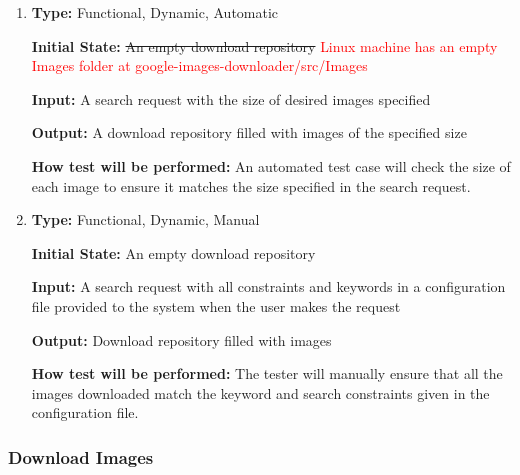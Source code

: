 \documentclass[12pt, titlepage]{article}
\begin{document}
\begin{enumerate}[label=FR-SQ\arabic*:, wide=0pt, leftmargin=*]
\item \phantom{empty}

\textbf{Type:} Functional, Dynamic, Automatic
					
\textbf{Initial State:} \sout{An empty download repository}
\textcolor{red}{Linux machine has an empty Images folder at google-images-downloader/src/Images}
					
\textbf{Input:} A search request with the size of desired images specified
					
\textbf{Output:} A download repository filled with images of the specified size
					
\textbf{How test will be performed:} An automated test case will check the size of each image to ensure it matches the size specified in the search request.

\item \phantom{empty}

\textbf{Type:} Functional, Dynamic, Manual
					
\textbf{Initial State:} An empty download repository
					
\textbf{Input:} A search request with all constraints and keywords in a configuration file provided to the system when the user makes the request
					
\textbf{Output:} Download repository filled with images
					
\textbf{How test will be performed:} The tester will manually ensure that all the images downloaded match the keyword and search constraints given in the configuration file.

\end{enumerate}

\subsubsection{Download Images}
\end{document}
